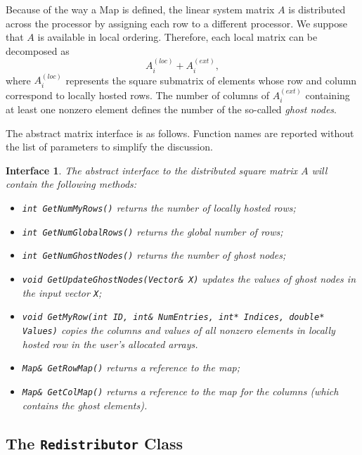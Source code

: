 \documentclass[acmtocl]{acmtrans2m}
\newtheorem{interface}{Interface}[section]
\begin{document}
Because of the way a Map is defined, the linear system matrix $A$ is
distributed
across the processor by assigning each row to a different processor.
We suppose that $A$ is available in local ordering.
Therefore, each local matrix can be decomposed as
\begin{equation}
A^{(loc)}_i + A^{(ext)}_i,
  \end{equation}
where $A^{(loc)}_i$ represents the square submatrix of elements whose row
and column correspond to locally hosted rows. The number of columns of
$A^{(ext)}_i$ containing at least one nonzero element defines the number of
the so-called {\sl ghost nodes}.

\smallskip

The abstract matrix interface is as
follows. Function names are reported
without the list of parameters to simplify the discussion.

\begin{interface}
\label{int:ami}
The abstract interface to the distributed square matrix $A$
will contain the following methods:
\begin{itemize}
\item \verb!int GetNumMyRows()! returns the number of locally hosted rows;
\item \verb!int GetNumGlobalRows()! returns the global number of rows;
\item \verb!int GetNumGhostNodes()! returns the number of ghost nodes;
\item \verb!void GetUpdateGhostNodes(Vector& X)! updates the values of ghost nodes
 in the input vector {\tt X};
\item {\tt void GetMyRow(int ID, int\& NumEntries, int* Indices, double*
                             Values)} copies the
columns and values of all nonzero elements in locally hosted row 
in the user's allocated arrays.
\item \verb!Map& GetRowMap()! returns a reference to the map;
\item \verb!Map& GetColMap()! returns a reference to the map for the columns
(which contains the ghost elements).
\end{itemize}
\end{interface}

\subsection{The {\tt Redistributor} Class}
\end{document}

